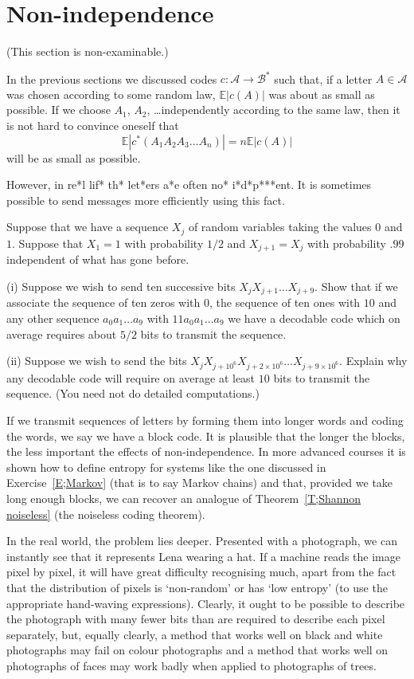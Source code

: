 \section{Non-independence}

(This section is non-examinable.)

In the previous sections we discussed codes
$c:{\mathcal A}\rightarrow{\mathcal B}^{*}$
such that, if a letter $A\in{\mathcal A}$ was chosen according to
some random law, ${\mathbb E}|c(A)|$ was about
as small as possible. If we choose $A_{1}$, $A_{2}$,
\dots independently according to the same law,
then it is not hard to convince oneself that
\[{\mathbb E}|c^{*}(A_{1}A_{2}A_{3}\dots A_{n})|
=n{\mathbb E}|c(A)|\]
will be as small as possible.

However, in re*l lif* th* let*ers a*e 
often no* i*d*p***ent. It is sometimes possible
to send messages more
efficiently using this fact.
\begin{exercise}\label{E;Markov} 
Suppose that we have a sequence
$X_{j}$ of random variables taking the values
$0$ and $1$. Suppose that $X_{1}=1$ with probability $1/2$
and
$X_{j+1}=X_{j}$ with probability
$.99$ independent of what has gone before.

(i) Suppose we wish to send ten successive bits
$X_{j}X_{j+1}\dots X_{j+9}$. Show that if we associate
the sequence of ten zeros with $0$, the sequence
of ten ones with $10$ and any other sequence
$a_{0}a_{1}\dots a_{9}$ with $11a_{0}a_{1}\dots a_{9}$
we have a decodable code which on average requires 
about $5/2$ bits to transmit the sequence.

(ii) Suppose we wish to send the bits
$X_{j}X_{j+10^{6}}X_{j+2\times 10^{6}}\dots X_{j+9\times 10^{6}}$. 
Explain why any decodable code will require
on average at least $10$ bits to transmit the sequence.
(You need not do detailed computations.)
\end{exercise}

If we transmit sequences of letters by forming
them into longer words and coding the words,
we say we have a block code. It is plausible that
the longer the blocks, the less important the
effects of non-independence. In more advanced courses
it is shown how to define entropy for systems
like the one discussed in Exercise~\ref{E;Markov}
(that is to say Markov chains) and that, provided
we take long enough blocks, we can recover
an analogue of Theorem~\ref{T;Shannon noiseless}
(the noiseless coding theorem).

In the real world, the problem lies deeper.
Presented with a photograph, we can instantly
see that it represents Lena wearing a hat.
If a machine reads the image pixel by pixel,
it will have great difficulty recognising
much, apart from the fact that the distribution
of pixels is `non-random' or has `low entropy'
(to use the appropriate hand-waving expressions).
Clearly, it ought to be possible to describe the photograph
with many fewer bits than are required to describe
each pixel separately, but, equally clearly, 
a method that works well on black and white photographs
may fail on colour photographs and a method that works well
on photographs of faces may work badly 
when applied to photographs  
of trees.

